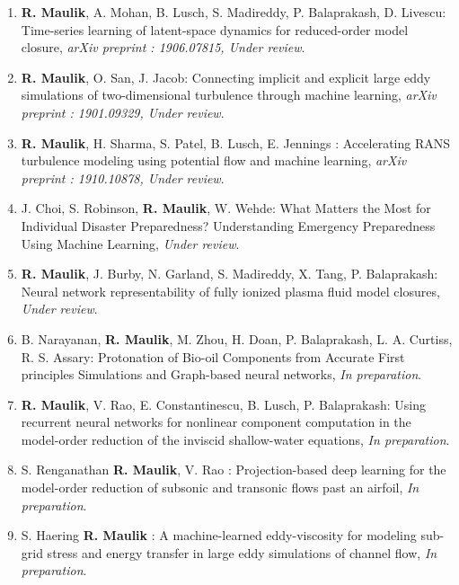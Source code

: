 \documentclass[letterpaper]{article}
\begin{document}
\begin{enumerate}

\item \textbf{R. Maulik}, A. Mohan, B. Lusch, S. Madireddy, P. Balaprakash, D. Livescu: Time-series learning of latent-space dynamics for reduced-order model closure, {\it arXiv preprint : 1906.07815, Under review}.

\item \textbf{R. Maulik}, O. San, J. Jacob: Connecting implicit and explicit large eddy simulations of two-dimensional turbulence through machine learning, {\it arXiv preprint : 1901.09329, Under review}.

\item \textbf{R. Maulik}, H. Sharma, S. Patel, B. Lusch, E. Jennings : Accelerating RANS turbulence modeling using potential flow and machine learning, {\it \it arXiv preprint : 1910.10878, Under review}. 

\item J. Choi, S. Robinson, \textbf{R. Maulik}, W. Wehde: What Matters the Most for Individual Disaster Preparedness? Understanding Emergency Preparedness Using Machine Learning, {\it Under review}.

\item \textbf{R. Maulik}, J. Burby, N. Garland, S. Madireddy, X. Tang, P. Balaprakash: Neural network representability of fully ionized plasma fluid model closures, {\it Under review}.

\item B. Narayanan, \textbf{R. Maulik}, M. Zhou, H. Doan, P. Balaprakash, L. A. Curtiss, R. S. Assary: Protonation of Bio-oil Components from Accurate First principles Simulations and Graph-based neural networks, {\it In preparation}.

\item \textbf{R. Maulik}, V. Rao, E. Constantinescu, B. Lusch, P. Balaprakash: Using recurrent neural networks for nonlinear component computation in the model-order reduction of the inviscid shallow-water equations, {\it In preparation}.

\item S. Renganathan \textbf{R. Maulik}, V. Rao : Projection-based deep learning for the model-order reduction of subsonic and transonic flows past an airfoil, {\it In preparation}.

\item S. Haering \textbf{R. Maulik} : A machine-learned eddy-viscosity for modeling sub-grid stress and energy transfer in large eddy simulations of channel flow, {\it In preparation}.



\end{enumerate}
\end{document}
